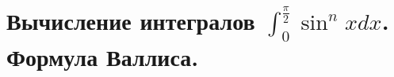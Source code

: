\documentclass[../main.tex]{subfiles}
\begin{document}
\newpage
\section{Вычисление интегралов \( \int_{ 0}^{ \frac{ \pi}{ 2}} \sin^n xdx\). Формула Валлиса.}
\end{document}
